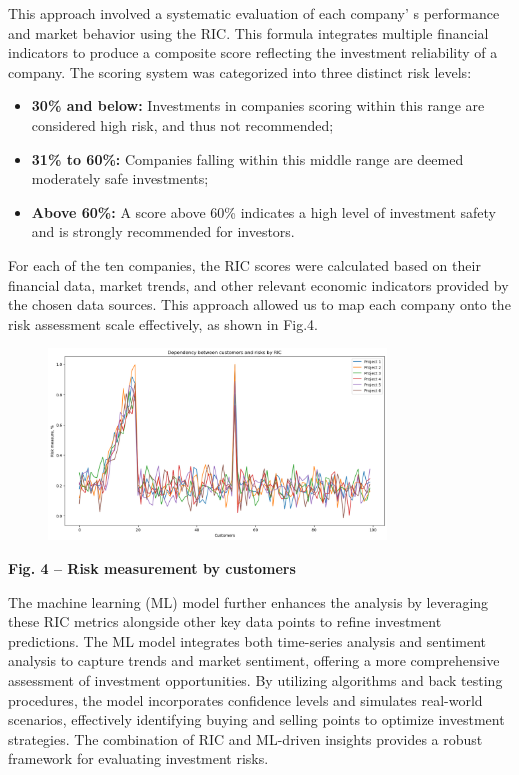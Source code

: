 {This approach involved a systematic evaluation of each
company' s performance and market behavior using the RIC.
This formula integrates multiple financial indicators to produce a
composite score reflecting the investment reliability of a company. The
scoring system was categorized into three distinct risk levels:

\begin{itemize}
\item
  {\bfseries 30\% and below:} Investments in companies scoring within this
  range are considered high risk, and thus not recommended;
\item
  {\bfseries 31\% to 60\%:} Companies falling within this middle range are
  deemed moderately safe investments;
\item
  {\bfseries Above 60\%:} A score above 60\% indicates a high level of
  investment safety and is strongly recommended for investors.
\end{itemize}

For each of the ten companies, the RIC scores were calculated based on
their financial data, market trends, and other relevant economic
indicators provided by the chosen data sources. This approach allowed us
to map each company onto the risk assessment scale effectively, as shown
in Fig.4.

\begin{figure}[H]
	\centering
	\includegraphics[width=0.8\textwidth]{media/ict2/image12}
	\caption*{}
\end{figure}


{\bfseries Fig. 4 -- Risk measurement by customers}

The machine learning (ML) model further enhances the analysis by
leveraging these RIC metrics alongside other key data points to refine
investment predictions. The ML model integrates both time-series
analysis and sentiment analysis to capture trends and market sentiment,
offering a more comprehensive assessment of investment opportunities. By
utilizing algorithms and back testing procedures, the model incorporates
confidence levels and simulates real-world scenarios, effectively
identifying buying and selling points to optimize investment strategies.
The combination of RIC and ML-driven insights provides a robust
framework for evaluating investment risks.

}
